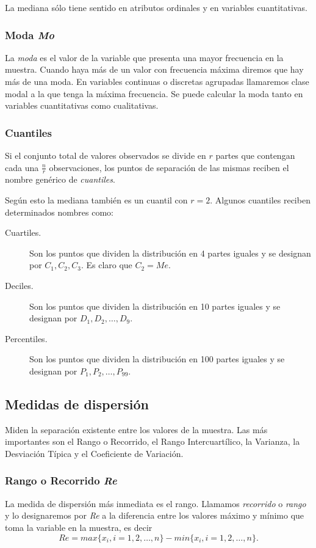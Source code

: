 La mediana sólo tiene sentido en atributos ordinales y en variables cuantitativas.

\subsubsection{Moda \textit{Mo}}
La \emph{moda} es el valor de la variable que presenta una mayor frecuencia en la muestra.
Cuando haya más de un valor con frecuencia máxima diremos que hay más de una moda. En variables continuas o discretas
agrupadas llamaremos clase modal a la que tenga la máxima frecuencia.
Se puede calcular la moda tanto en variables cuantitativas como cualitativas.

\subsubsection{Cuantiles}
Si el conjunto total de valores observados se divide en $r$ partes que contengan cada una $\frac{n}{r}$ observaciones,
los puntos de separación de las mismas reciben el nombre genérico de \emph{cuantiles}.

Según esto la mediana también es un cuantil con $r=2$.
Algunos cuantiles reciben determinados nombres como:
\begin{description}
\item [Cuartiles.] Son los puntos que dividen la distribución en 4 partes iguales y se designan por $C_1,C_2,C_3$. Es
claro que $C_2=Me$.
\item[Deciles.] Son los puntos que dividen la distribución en 10 partes iguales y se designan por $D_1,D_2,\ldots,D_9$.
\item [Percentiles.] Son los puntos que dividen la distribución en 100 partes iguales y se designan por
$P_1,P_2,\ldots,P_{99}$.
\end{description}

\subsection{Medidas de dispersión}
Miden la separación existente entre los valores de la muestra.
Las más importantes son el Rango o Recorrido, el Rango Intercuartílico, la Varianza, la Desviación Típica y el
Coeficiente de Variación.

\subsubsection{Rango o Recorrido \textit{Re}}
La medida de dispersión más inmediata es el rango. Llamamos \emph{recorrido} o \emph{rango} y lo designaremos por
\textit{Re} a la diferencia entre los valores máximo y mínimo que toma la variable en la muestra, es decir
\[
Re = max\{x_i, i=1,2,\ldots,n\} - min\{x_i, i=1,2,\ldots,n\}.
\]

